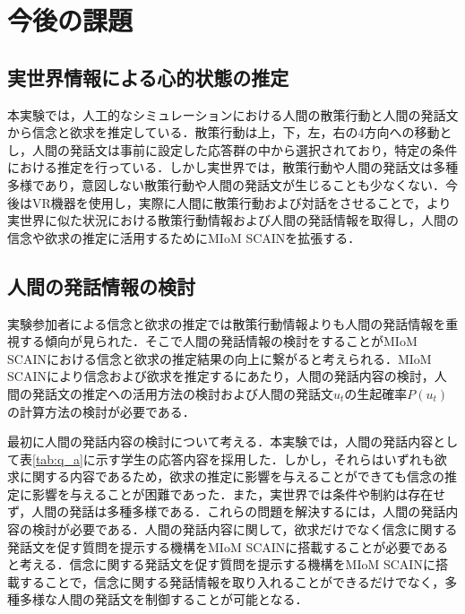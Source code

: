 \chapter{今後の課題}

\section{実世界情報による心的状態の推定}
本実験では，人工的なシミュレーションにおける人間の散策行動と人間の発話文から信念と欲求を推定している．散策行動は上，下，左，右の4方向への移動とし，人間の発話文は事前に設定した応答群の中から選択されており，特定の条件における推定を行っている．しかし実世界では，散策行動や人間の発話文は多種多様であり，意図しない散策行動や人間の発話文が生じることも少なくない．今後はVR機器を使用し，実際に人間に散策行動および対話をさせることで，より実世界に似た状況における散策行動情報および人間の発話情報を取得し，人間の信念や欲求の推定に活用するためにMIoM SCAINを拡張する．

\section{人間の発話情報の検討}

\par
実験参加者による信念と欲求の推定では散策行動情報よりも人間の発話情報を重視する傾向が見られた．そこで人間の発話情報の検討をすることがMIoM SCAINにおける信念と欲求の推定結果の向上に繋がると考えられる．MIoM SCAINにより信念および欲求を推定するにあたり，人間の発話内容の検討，人間の発話文の推定への活用方法の検討および人間の発話文$u_t$の生起確率$P(u_t)$の計算方法の検討が必要である．

\par
最初に人間の発話内容の検討について考える．本実験では，人間の発話内容として表\ref{tab:q_a}に示す学生の応答内容を採用した．しかし，それらはいずれも欲求に関する内容であるため，欲求の推定に影響を与えることができても信念の推定に影響を与えることが困難であった．また，実世界では条件や制約は存在せず，人間の発話は多種多様である．これらの問題を解決するには，人間の発話内容の検討が必要である．人間の発話内容に関して，欲求だけでなく信念に関する発話文を促す質問を提示する機構をMIoM SCAINに搭載することが必要であると考える．信念に関する発話文を促す質問を提示する機構をMIoM SCAINに搭載することで，信念に関する発話情報を取り入れることができるだけでなく，多種多様な人間の発話文を制御することが可能となる．

